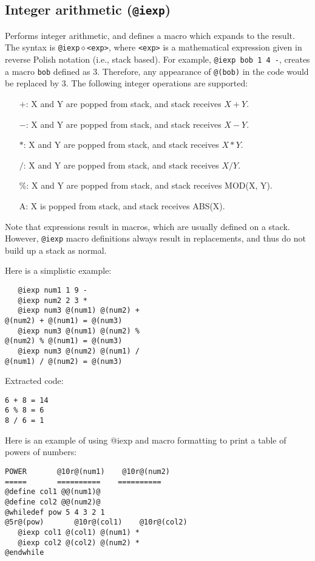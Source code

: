 \subsection{Integer arithmetic ({\tt @iexp})}
Performs integer arithmetic, and defines a macro which expands to the result.
The syntax is {\tt @iexp$\diamond$<exp>}, where {\tt <exp>} is a mathematical
expression given in reverse Polish notation (i.e., stack based).
For example, {\tt @iexp bob 1 4 -}, creates a macro {\tt bob} defined as 3.
Therefore, any appearance of {\tt @(bob)} in the code would be replaced by 3.
The following integer operations are supported: 
\begin{itemize}
\item[$+$:]  X and Y are popped from stack, and stack receives $X + Y$.
\item[$-$:]  X and Y are popped from stack, and stack receives $X - Y$.
\item[$*$:]  X and Y are popped from stack, and stack receives $X * Y$.
\item[$/$:]  X and Y are popped from stack, and stack receives $X / Y$.
\item[\%:]  X and Y are popped from stack, and stack receives MOD(X, Y).
\item[A:]  X is popped from stack, and stack receives ABS(X).
\end{itemize}

Note that expressions result in macros, which are usually defined on a stack.  
However, {\tt @iexp} macro definitions always result in replacements, and
thus do not build up a stack as normal.

\noindent
Here is a simplistic example:
\begin{verbatim}
   @iexp num1 1 9 -
   @iexp num2 2 3 *
   @iexp num3 @(num1) @(num2) +
@(num2) + @(num1) = @(num3)
   @iexp num3 @(num1) @(num2) %
@(num2) % @(num1) = @(num3)
   @iexp num3 @(num2) @(num1) /
@(num1) / @(num2) = @(num3)
\end{verbatim}

\noindent
Extracted code:
\begin{verbatim}
6 + 8 = 14
6 % 8 = 6
8 / 6 = 1
\end{verbatim}

Here is an example of using @iexp and macro formatting to print a table of
powers of numbers:

\begin{verbatim}
POWER       @10r@(num1)    @10r@(num2)
=====       ==========    ==========
@define col1 @@(num1)@
@define col2 @@(num2)@
@whiledef pow 5 4 3 2 1
@5r@(pow)       @10r@(col1)    @10r@(col2)
   @iexp col1 @(col1) @(num1) *
   @iexp col2 @(col2) @(num2) *
@endwhile
\end{verbatim}

